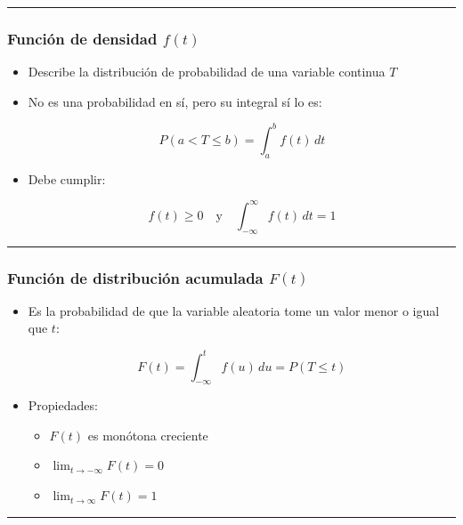 \documentclass[
  letterpaper,
  DIV=11,
  numbers=noendperiod]{scrartcl}
\providecommand{\tightlist}{%
  \setlength{\itemsep}{0pt}\setlength{\parskip}{0pt}}
\begin{document}
\begin{center}\rule{0.5\linewidth}{0.5pt}\end{center}

\subsubsection{\texorpdfstring{Función de densidad
\(f(t)\)}{Función de densidad f(t)}}\label{funciuxf3n-de-densidad-ft}

\begin{itemize}
\item
  Describe la distribución de probabilidad de una variable continua
  \(T\)
\item
  No es una probabilidad en sí, pero su integral sí lo es:

  \[
  P(a < T \leq b) = \int_a^b f(t) \, dt
  \]
\item
  Debe cumplir:

  \[
  f(t) \geq 0 \quad \text{y} \quad \int_{-\infty}^{\infty} f(t) \, dt = 1
  \]
\end{itemize}

\begin{center}\rule{0.5\linewidth}{0.5pt}\end{center}

\subsubsection{\texorpdfstring{Función de distribución acumulada
\(F(t)\)}{Función de distribución acumulada F(t)}}\label{funciuxf3n-de-distribuciuxf3n-acumulada-ft}

\begin{itemize}
\item
  Es la probabilidad de que la variable aleatoria tome un valor menor o
  igual que \(t\):

  \[
  F(t) = \int_{-\infty}^t f(u) \, du = P(T \leq t)
  \]
\item
  Propiedades:

  \begin{itemize}
  \tightlist
  \item
    \(F(t)\) es monótona creciente
  \item
    \(\lim_{t \to -\infty} F(t) = 0\)
  \item
    \(\lim_{t \to \infty} F(t) = 1\)
  \end{itemize}
\end{itemize}

\begin{center}\rule{0.5\linewidth}{0.5pt}\end{center}
\end{document}
